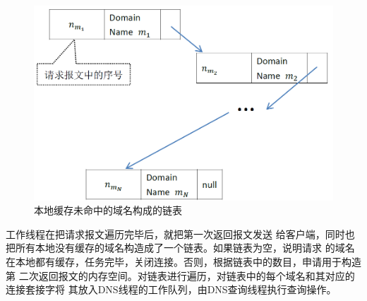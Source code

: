 \begin{figure}[H]
\centering
\includegraphics[keepaspectratio, scale=0.5]{pitures/response2_dns_list.png}
\caption{本地缓存未命中的域名构成的链表} 
\end{figure}

\par{工作线程在把请求报文遍历完毕后，就把第一次返回报文发送
给客户端，同时也把所有本地没有缓存的域名构造成了一个链表。如果链表为空，说明请求
的域名在本地都有缓存，任务完毕，关闭连接。否则，根据链表中的数目，申请用于构造第
二次返回报文的内存空间。对链表进行遍历，对链表中的每个域名和其对应的连接套接字将
其放入DNS线程的工作队列，由DNS查询线程执行查询操作。}

